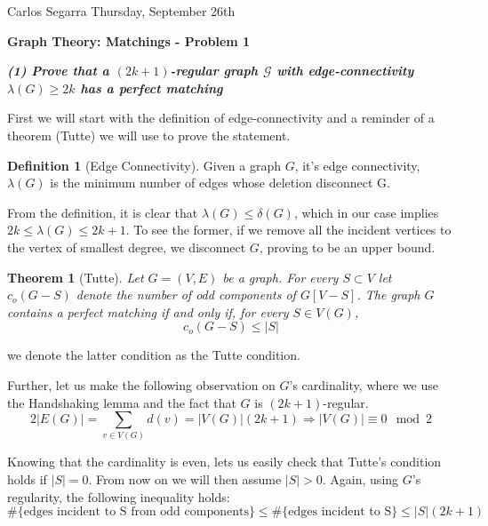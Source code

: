 \documentclass[a4paper, 10pt]{article}
\newtheorem{theorem}{Theorem}
\theoremstyle{definition} %
\newtheorem{definition}{Definition}
\begin{document}
Carlos Segarra \hfill Thursday, September 26th

\vspace{15pt}

\textbf{\Large Graph Theory: Matchings - Problem 1}

\vspace{20pt}

\textbf{\textit{(1) Prove that a $(2k+1)$-regular graph $\mathcal{G}$ with edge-connectivity $\lambda(G) \geq 2k$ has a perfect matching}}

\vspace{3pt}

First we will start with the definition of edge-connectivity and a reminder of a theorem (Tutte) we will use to prove the statement.

\begin{definition}[Edge Connectivity]
    Given a graph $G$, it's edge connectivity, $\lambda(G)$ is the minimum number of edges whose deletion disconnect G.
\end{definition}

From the definition, it is clear that $\lambda(G) \leq \delta(G)$, which in our case implies $2k \leq \lambda(G) \leq 2k + 1$. To see the former, if we remove all the incident vertices to the vertex of smallest degree, we disconnect $G$, proving to be an upper bound.

\begin{theorem}[Tutte]
    Let $G = (V, E)$ be a graph. For every $S \subset V$ let $c_o(G - S)$ denote the number of odd components of $G[V-S]$. The graph $G$ contains a perfect matching if and only if, for every $S \in V(G)$,
    $$c_o(G-S) \leq |S| $$
\end{theorem}
we denote the latter condition as the Tutte condition.

Further, let us make the following observation on $G$'s cardinality, where we use the Handshaking lemma and the fact that $G$ is $(2k + 1)$-regular.
$$2|E(G)| = \sum_{v \in V(G)} d(v) = |V(G)|(2k + 1) \Rightarrow |V(G)| \equiv 0 \mod 2$$

Knowing that the cardinality is even, lets us easily check that Tutte's condition holds if $|S| = 0$. From now on we will then assume $|S| > 0$. Again, using $G$'s regularity, the following inequality holds:
\begin{equation}\label{edge-ineq}
\#\lbrace\text{edges incident to S from odd components}\rbrace \leq \#\lbrace\text{edges incident to S}\rbrace \leq |S|(2k + 1)
\end{equation}
\end{document}
